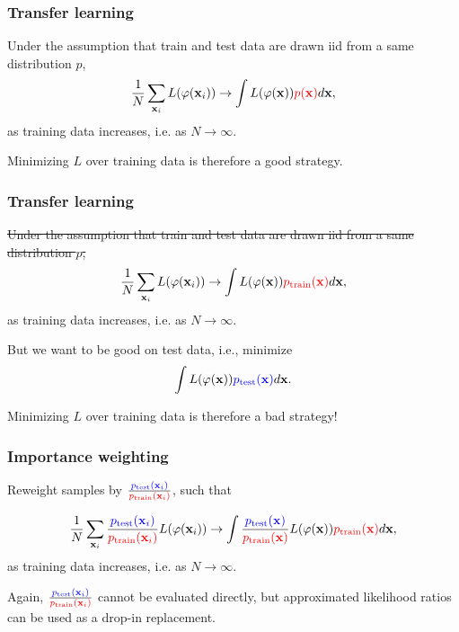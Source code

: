 \documentclass{beamer}
\begin{document}
\begin{frame}
    \frametitle{Transfer learning}

    Under the assumption that train and test data are drawn iid from a same distribution $p$,
    $$\frac{1}{N} \sum_{\mathbf{x}_i} L(\varphi(\mathbf{x}_i)) \to \int L(\varphi(\mathbf{x})) {\color{red} p(\mathbf{x})} d\mathbf{x},$$
    as training data increases, i.e. as $N \to \infty$.

    \vspace{1cm}

    Minimizing $L$ over training data is therefore a {\color{blue} good strategy}.


\end{frame}

\begin{frame}
    \frametitle{Transfer learning}

    \sout{Under the assumption that train and test data are drawn iid from a same distribution $p$,}
    $$\frac{1}{N} \sum_{\mathbf{x}_i} L(\varphi(\mathbf{x}_i)) \to \int L(\varphi(\mathbf{x})) {\color{red} p_\text{train}(\mathbf{x})} d\mathbf{x},$$
    as training data increases, i.e. as $N \to \infty$.

    \vspace{1cm}

    But we want to be good on test data, i.e., minimize
    $$\int L(\varphi(\mathbf{x})) {\color{blue} p_\text{test}(\mathbf{x})} d\mathbf{x}.$$

    Minimizing $L$ over training data is therefore a {\color{red} bad strategy}!

\end{frame}

\begin{frame}
    \frametitle{Importance weighting}

    Reweight samples by $\frac{\color{blue} p_\text{test}(\mathbf{x}_i)}{\color{red} p_\text{train}(\mathbf{x}_i)}$, such that

    $$\frac{1}{N} \sum_{\mathbf{x}_i} \frac{\color{blue} p_\text{test}(\mathbf{x}_i)}{\color{red} p_\text{train}(\mathbf{x}_i)}  L(\varphi(\mathbf{x}_i)) \to \int \frac{\color{blue}  p_\text{test}(\mathbf{x})}{\color{red} p_\text{train}(\mathbf{x})} L(\varphi(\mathbf{x})) {\color{red} p_\text{train}(\mathbf{x})}  d\mathbf{x},$$
    as training data increases, i.e. as $N \to \infty$.

    \vspace{1cm}

    Again, $\frac{\color{blue} p_\text{test}(\mathbf{x}_i)}{\color{red} p_\text{train}(\mathbf{x}_i)}$ cannot be evaluated directly, but approximated likelihood ratios can be used as a drop-in replacement.
\end{frame}
\end{document}
